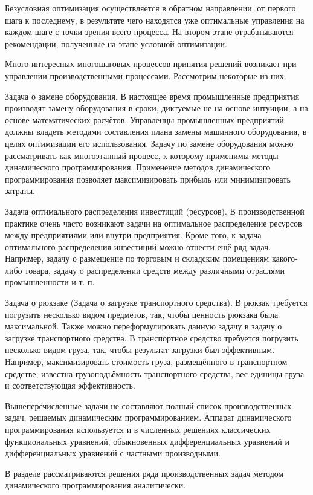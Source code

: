 Безусловная оптимизация осуществляется в обратном направлении: от первого шага к последнему, в результате чего находятся уже оптимальные управления на каждом шаге с точки зрения всего процесса. На втором этапе отрабатываются рекомендации, полученные на этапе условной оптимизации.

Много интересных многошаговых процессов принятия решений возникает при управлении производственными процессами. Рассмотрим некоторые из них.

Задача о замене оборудования. В настоящее время промышленные предприятия производят замену оборудования в сроки, диктуемые не на основе интуиции, а на основе математических расчётов. Управленцы промышленных предприятий должны владеть методами составления плана замены машинного оборудования, в целях оптимизации его использования. Задачу по замене оборудования можно рассматривать как многоэтапный процесс, к которому применимы методы динамического программирования. Применение методов динамического программирования позволяет максимизировать прибыль или минимизировать затраты.

Задача оптимального распределения инвестиций (ресурсов). В производственной практике очень часто возникают задачи на оптимальное распределение ресурсов между предприятиями или внутри предприятия. Кроме того, к задача оптимального распределения инвестиций можно отнести ещё ряд задач. Например, задачу о размещение по торговым и складским помещениям какого-либо товара, задачу о распределении средств между различными отраслями промышленности и т. п.

Задача о рюкзаке (Задача о загрузке транспортного средства). В рюкзак требуется погрузить несколько видом предметов, так, чтобы ценность рюкзака была максимальной. Также можно переформулировать данную задачу в задачу о загрузке транспортного средства. В транспортное средство требуется погрузить несколько видом груза, так, чтобы результат загрузки был эффективным. Например, максимизировать стоимость груза, размещённого в транспортном средстве, известна грузоподъёмность транспортного средства, вес единицы груза и соответствующая эффективность.

Вышеперечисленные задачи не составляют полный список производственных задач, решаемых динамическим программированием. Аппарат динамического программирования используется и в численных решениях классических функциональных уравнений, обыкновенных дифференциальных уравнений и дифференциальных уравнений с частными производными.

В разделе рассматриваются решения ряда производственных задач методом динамического программирования аналитически.



